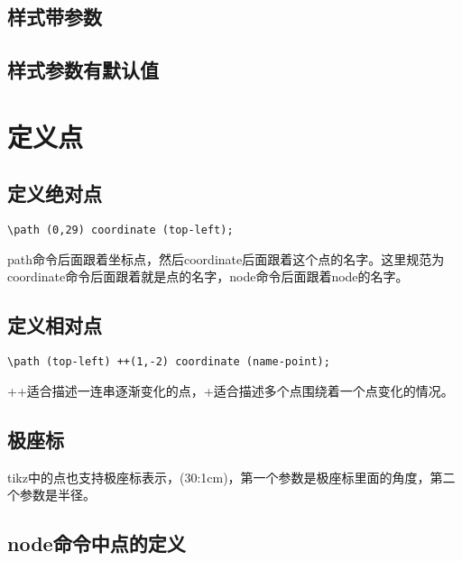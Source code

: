\documentclass[11pt,oneside]{book}
\begin{document}
\begin{common-format}
\subsection{样式带参数}

\subsection{样式参数有默认值}

\section{定义点}
\subsection{定义绝对点}
\begin{Verbatim}
\path (0,29) coordinate (top-left);
\end{Verbatim}
path命令后面跟着坐标点，然后coordinate后面跟着这个点的名字。这里规范为coordinate命令后面跟着就是点的名字，node命令后面跟着node的名字。

\subsection{定义相对点}
\begin{Verbatim}
\path (top-left) ++(1,-2) coordinate (name-point);
\end{Verbatim}

++适合描述一连串逐渐变化的点，+适合描述多个点围绕着一个点变化的情况。
\subsection{极座标}
tikz中的点也支持极座标表示，(30:1cm)，第一个参数是极座标里面的角度，第二个参数是半径。


\subsection{node命令中点的定义}


\end{common-format}
\end{document}

